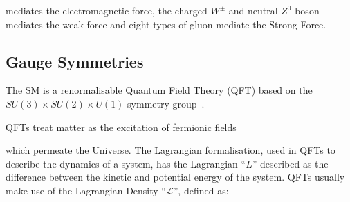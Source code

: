  mediates the electromagnetic force, the charged $W^\pm$ and neutral $Z^0$ boson mediates the weak force and eight types of gluon mediate the Strong Force\cite{LagrangiansSM}. 



\begin{table}[htbp]
\label{tab:bosons}
  \centering
\end{table}






\subsection{Gauge Symmetries}\label{subsec:gaugeSymmetries}
The SM is a renormalisable Quantum Field Theory (QFT) based on the $SU(3)\times SU(2) \times U(1)$ symmetry group~\cite{LagrangiansSM}.

QFTs treat matter as the excitation of fermionic fields

 which permeate the Universe. 
The Lagrangian formalisation, used in QFTs to describe the dynamics of a system, has the Lagrangian ``$L$'' described as the difference between the kinetic and potential energy of the system\cite{LagrangiansSM}. 
QFTs usually make use of the Lagrangian Density ``$\mathcal{L}$'', defined as\cite{QFT}:

